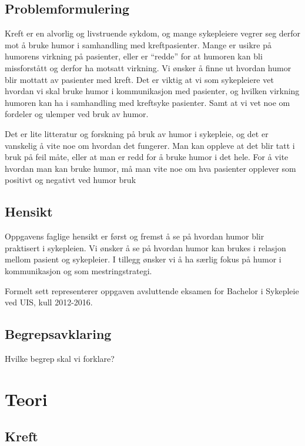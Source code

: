 \section{Problemformulering}

Kreft er en alvorlig og livstruende sykdom, og mange sykepleiere vegrer seg
derfor mot å bruke humor i samhandling med kreftpasienter. Mange er usikre på
humorens virkning på pasienter, eller er “redde” for at humoren kan bli
missforstått og derfor ha motsatt virkning. Vi ønsker å finne ut hvordan humor
blir mottatt av pasienter med kreft. Det er viktig at vi som sykepleiere vet
hvordan vi skal bruke humor i kommunikasjon med pasienter, og hvilken virkning
humoren kan ha i samhandling med kreftsyke pasienter. Samt at vi vet noe om
fordeler og ulemper ved bruk av humor. 

Det er lite litteratur og forskning på bruk av humor i sykepleie, og det er
vanskelig å vite noe om hvordan det fungerer. Man kan oppleve at det blir tatt
i bruk på feil måte, eller at man er redd for å bruke humor i det hele. For å
vite hvordan man kan bruke humor, må man vite noe om hva pasienter opplever som
positivt og negativt ved humor bruk

\section{Hensikt}

Oppgavens faglige hensikt er først og fremst å se på hvordan humor blir
praktisert i sykepleien. Vi ønsker å se på hvordan humor kan brukes i relasjon
mellom pasient og sykepleier. I tillegg ønsker vi å ha særlig fokus på humor i
kommunikasjon og som mestringstrategi.

Formelt sett representerer oppgaven avsluttende eksamen for Bachelor i
Sykepleie ved UIS, kull 2012-2016.

\section{Begrepsavklaring}

Hvilke begrep skal vi forklare? 

\chapter{Teori}

\section{Kreft}

